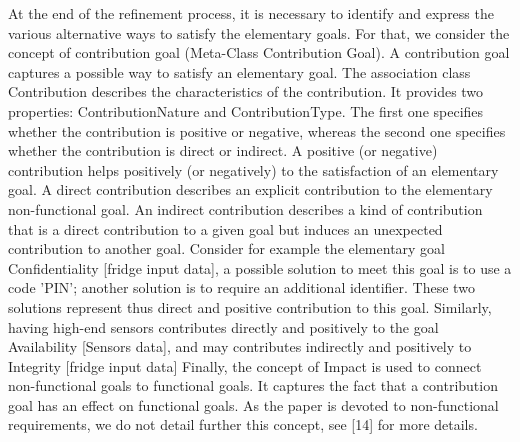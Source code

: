 At the end of the refinement process, it is necessary to identify and express the various alternative ways to satisfy the elementary goals. For that, we consider the concept of contribution goal (Meta-Class Contribution Goal). A contribution goal captures a possible way to satisfy an elementary goal. The association class Contribution describes the characteristics of the contribution. It provides two properties: ContributionNature and ContributionType. The first one specifies whether the contribution is positive or negative, whereas the second one specifies whether the contribution is direct or indirect. 
A positive (or negative) contribution helps positively (or negatively) to the satisfaction of an elementary goal. 
A direct contribution describes an explicit contribution to the elementary non-functional goal. An indirect contribution describes a kind of contribution that is a direct contribution to a given goal but induces an unexpected contribution to another goal.
Consider for example the elementary goal Confidentiality [fridge input data], a possible solution to meet this goal is to use a code 'PIN'; another solution is to require an additional identifier. These two solutions represent thus direct and positive contribution to this goal. Similarly, having high-end sensors contributes directly and positively to the goal Availability [Sensors data], and may contributes indirectly and positively to Integrity [fridge input data]
Finally, the concept of Impact is used to connect non-functional goals to functional goals. It captures the fact that a contribution goal has an effect on functional goals. As the paper is devoted to non-functional requirements, we do not detail further this concept, see [14] for more details.
